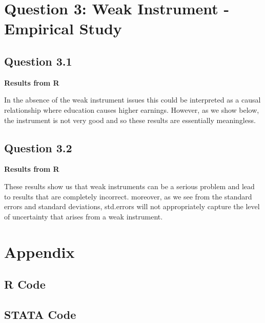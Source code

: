 \documentclass[11pt]{article}
\begin{document}
\section{Question 3: Weak Instrument - Empirical Study}

\subsection{Question 3.1}

\begin{center}
	
	\centering
	
	\textbf{Results from R}\par\medskip
	\scalebox{1}{
		
	}
\end{center}

In the absence of the weak instrument issues this could be interpreted as a causal relationship where education causes higher earnings. However, as we show below, the instrument is not very good and so these results are essentially meaningless. 


\subsection{Question 3.2}
\begin{center}
	
	\centering
	
	\textbf{Results from R}\par\medskip
	\scalebox{1}{
		
	}
\end{center}



These results show us that weak instruments can be a serious problem and lead to results that are completely incorrect. moreover, as we see from the standard errors and standard deviations, std.errors will not appropriately capture the level of uncertainty that arises from a weak instrument. 

\section{Appendix}
\subsection{R Code}



\subsection{STATA Code}


\end{document}

